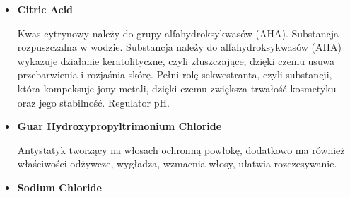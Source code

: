 \begin{itemize}


\item \textbf{Citric Acid}

Kwas cytrynowy należy do grupy alfahydroksykwasów (AHA). Substancja rozpuszczalna w wodzie. Substancja należy do alfahydroksykwasów (AHA) wykazuje działanie keratolityczne, czyli złuszczające, dzięki czemu usuwa przebarwienia i rozjaśnia skórę. Pełni rolę sekwestranta, czyli substancji, która kompeksuje jony metali, dzięki czemu zwiększa trwałość kosmetyku oraz jego stabilność. Regulator pH.

\item \textbf{Guar Hydroxypropyltrimonium Chloride}

Antystatyk tworzący na włosach ochronną powłokę, dodatkowo ma również właściwości odżywcze, wygładza, wzmacnia włosy, ułatwia rozczesywanie.



\item \textbf{Sodium Chloride}


\end{itemize}
